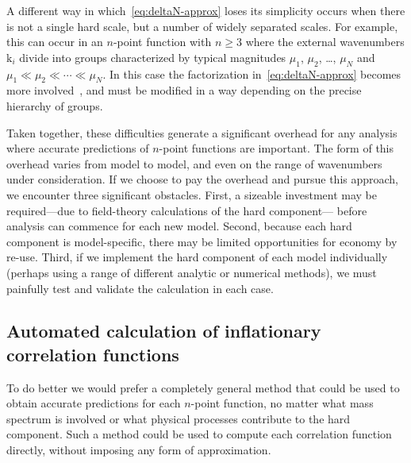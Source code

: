 \documentclass[11pt,a4paper]{article}
\newcommand{\vect}[1]{\bm{\mathrm{{#1}}}}
\renewcommand{\geq}{\geqslant}
\begin{document}
A different way in which~\eqref{eq:deltaN-approx}
loses its simplicity
occurs when there is not a single hard scale,
but a number of widely separated scales.
For example, this can occur in an $n$-point function
with $n \geq 3$
where the external wavenumbers $\vect{k}_i$
divide into groups characterized by typical
magnitudes $\mu_1$, $\mu_2$, \ldots, $\mu_N$
and $\mu_1 \ll \mu_2 \ll \cdots \ll \mu_N$.
In this case the factorization in~\eqref{eq:deltaN-approx}
becomes more involved~\cite{Kenton:2015lxa},
and must be modified in a way depending on the precise
hierarchy of groups.

Taken together, these difficulties generate a significant
overhead
for any analysis where accurate predictions of
$n$-point functions are important.
The form of this overhead varies from model to model,
and even on the range of wavenumbers under consideration.
If we choose to pay the overhead 
and pursue this approach, we encounter three
significant obstacles.
First, a sizeable investment may be required---due to field-theory
calculations
of the hard component---%
before analysis can commence for each new model.
Second, because each hard component is model-specific, there
may be limited opportunities for economy by re-use.
Third, if we implement the hard component of each model
individually (perhaps using a range of different
analytic or numerical methods), we must painfully test and validate
the calculation in each case.

\subsection{Automated calculation of inflationary correlation functions}
To do better we would prefer a completely general method
that could be used to obtain accurate predictions for each $n$-point
function, no matter what mass spectrum
is involved or what physical
processes contribute to the hard component.
Such a method could be used to compute each correlation function directly,
without imposing any form of approximation.
\end{document}
